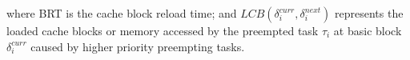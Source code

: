 \noindent where BRT is the cache block reload time; and \begin{math}\textit{LCB}(\delta_{i}^{curr},\delta_{i}^{next})\end{math} represents the loaded cache blocks or memory accessed by the preempted task \begin{math}\tau_{i}\end{math} at basic block \begin{math}\delta_{i}^{curr}\end{math} caused by higher priority preempting tasks.
